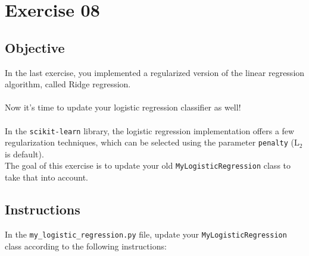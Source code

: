 \chapter{Exercise 08}

\newpage
{}
\makeheaderfilesforbidden

\section*{Objective}
In the last exercise, you implemented a regularized version 
of the linear regression algorithm, called Ridge regression.\\
\\
Now it's time to update your logistic regression classifier as well!\\
\\
In the \texttt{scikit-learn} library, the logistic regression implementation 
offers a few regularization techniques, which can be selected using 
the parameter \texttt{penalty} (L$_2$ is default).\\
The goal of this exercise is to update your old \texttt{MyLogisticRegression} class to 
take that into account.\\

\section*{Instructions}
In the \texttt{my\_logistic\_regression.py} file, update your \texttt{MyLogisticRegression} 
class according to the following instructions:\\
\\

